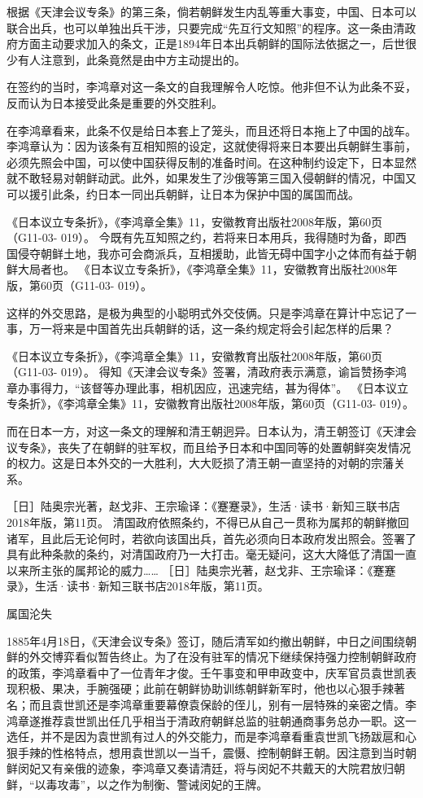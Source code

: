 \documentclass[12pt,UTF8]{ctexbook}
\begin{document}
根据《天津会议专条》的第三条，倘若朝鲜发生内乱等重大事变，中国、日本可以联合出兵，也可以单独出兵干涉，只要完成“先互行文知照”的程序。这一条由清政府方面主动要求加入的条文，正是1894年日本出兵朝鲜的国际法依据之一，后世很少有人注意到，此条竟然是由中方主动提出的。

在签约的当时，李鸿章对这一条文的自我理解令人吃惊。他非但不认为此条不妥，反而认为日本接受此条是重要的外交胜利。

在李鸿章看来，此条不仅是给日本套上了笼头，而且还将日本拖上了中国的战车。李鸿章认为：因为该条有互相知照的设定，这就使得将来日本要出兵朝鲜生事前，必须先照会中国，可以使中国获得反制的准备时间。在这种制约设定下，日本显然就不敢轻易对朝鲜动武。此外，如果发生了沙俄等第三国入侵朝鲜的情况，中国又可以援引此条，约日本一同出兵朝鲜，让日本为保护中国的属国而战。

《日本议立专条折》，《李鸿章全集》11，安徽教育出版社2008年版，第60页（G11-03- 019）。
今既有先互知照之约，若将来日本用兵，我得随时为备，即西国侵夺朝鲜土地，我亦可会商派兵，互相援助，此皆无碍中国字小之体而有益于朝鲜大局者也。 《日本议立专条折》，《李鸿章全集》11，安徽教育出版社2008年版，第60页（G11-03- 019）。

这样的外交思路，是极为典型的小聪明式外交伎俩。只是李鸿章在算计中忘记了一事，万一将来是中国首先出兵朝鲜的话，这一条约规定将会引起怎样的后果？

《日本议立专条折》，《李鸿章全集》11，安徽教育出版社2008年版，第60页（G11-03- 019）。
得知《天津会议专条》签署，清政府表示满意，谕旨赞扬李鸿章办事得力，“该督等办理此事，相机因应，迅速完结，甚为得体”。 《日本议立专条折》，《李鸿章全集》11，安徽教育出版社2008年版，第60页（G11-03- 019）。

而在日本一方，对这一条文的理解和清王朝迥异。日本认为，清王朝签订《天津会议专条》，丧失了在朝鲜的驻军权，而且给予日本和中国同等的处置朝鲜突发情况的权力。这是日本外交的一大胜利，大大贬损了清王朝一直坚持的对朝的宗藩关系。

［日］陆奥宗光著，赵戈非、王宗瑜译：《蹇蹇录》，生活·读书·新知三联书店2018年版，第11页。
清国政府依照条约，不得已从自己一贯称为属邦的朝鲜撤回诸军，且此后无论何时，若欲向该国出兵，首先必须向日本政府发出照会。签署了具有此种条款的条约，对清国政府乃一大打击。毫无疑问，这大大降低了清国一直以来所主张的属邦论的威力…… ［日］陆奥宗光著，赵戈非、王宗瑜译：《蹇蹇录》，生活·读书·新知三联书店2018年版，第11页。

属国沦失

1885年4月18日，《天津会议专条》签订，随后清军如约撤出朝鲜，中日之间围绕朝鲜的外交博弈看似暂告终止。为了在没有驻军的情况下继续保持强力控制朝鲜政府的政策，李鸿章看中了一位青年才俊。壬午事变和甲申政变中，庆军官员袁世凯表现积极、果决，手腕强硬；此前在朝鲜协助训练朝鲜新军时，他也以心狠手辣著名；而且袁世凯还是李鸿章重要幕僚袁保龄的侄儿，别有一层特殊的亲密之情。李鸿章遂推荐袁世凯出任几乎相当于清政府朝鲜总监的驻朝通商事务总办一职。这一选任，并不是因为袁世凯有过人的外交能力，而是李鸿章看重袁世凯飞扬跋扈和心狠手辣的性格特点，想用袁世凯以一当千，震慑、控制朝鲜王朝。因注意到当时朝鲜闵妃又有亲俄的迹象，李鸿章又奏请清廷，将与闵妃不共戴天的大院君放归朝鲜，“以毒攻毒”，以之作为制衡、警诫闵妃的王牌。
\end{document}
